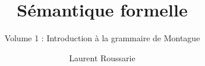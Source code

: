 \author{Laurent Roussarie}
\title{Sémantique formelle}
\subtitle{Volume 1 : Introduction à la grammaire de Montague }
\renewcommand{\lsSeries}{tbls}
\renewcommand{\lsSeriesNumber}{4}
